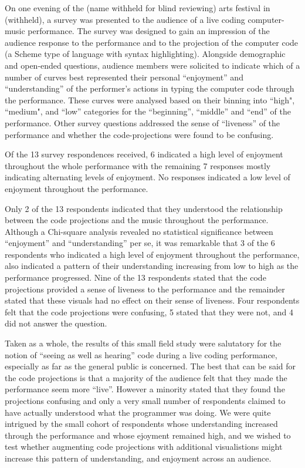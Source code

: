\documentclass{sig-alternate}
\begin{document}
On one evening of the (name withheld for blind reviewing) arts festival in (withheld), a survey was presented to the audience of a live coding computer-music performance. The survey was designed to gain an impression of the audience response to the performance and to the projection of the computer code (a Scheme type of language with syntax highlighting). Alongside demographic and open-ended questions, audience members were solicited to indicate which of a number of curves best represented their personal ``enjoyment'' and ``understanding'' of the performer's actions in typing the computer code through the performance. These curves were analysed based on their binning into ``high", ``medium", and ``low'' categories for the ``beginning'', ``middle'' and ``end'' of the performance. Other survey questions addressed the sense of ``liveness'' of the performance \cite{Auslander} and whether the code-projections were found to be confusing.

Of the 13 survey respondences received, 6 indicated a high level of enjoyment throughout the whole performance with the remaining 7 responses mostly indicating alternating levels of enjoyment. No responses indicated a low level of enjoyment throughout the performance.

Only 2 of the 13 respondents indicated that they understood the relationship between the code projections and the music throughout the performance. Although a Chi-square analysis revealed no statistical significance between ``enjoyment'' and ``understanding'' per se, it was remarkable that 3 of the 6 respondents who indicated a high level of enjoyment throughout the performance, also indicated a pattern of their understanding increasing from low to high as the performance progressed. Nine of the 13 respondents stated that the code projections provided a sense of liveness to the performance and the remainder stated that these visuals had no effect on their sense of liveness. Four respondents felt that the code projections were confusing, 5 stated that they were not, and 4 did not answer the question.

Taken as a whole, the results of this small field study were salutatory for the notion of ``seeing as well as hearing'' code during a live coding performance, especially as far as the general public is concerned. The best that can be said for the code projections is that a majority of the audience felt that they made the performance seem more ``live''. However a minority stated that they found the projections confusing and only a very small number of respondents claimed to have actually understood what the programmer was doing. We were quite intrigued by the small cohort of respondents whose understanding increased through the performance and whose ejoyment remained high, and we wished to test whether augmenting code projections with additional visualistions might increase this pattern of understanding, and enjoyment across an audience. 
\end{document}
